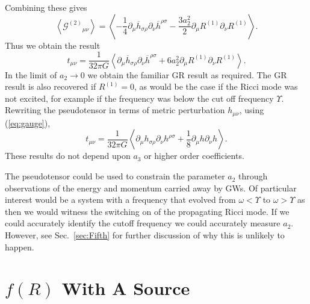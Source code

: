 \documentclass[aps,prd,amsfonts,amssymb,amsmath,nofootinbib,reprint,showpacs]{revtex4-1}
\newcommand{\eqnref}[1]{(\ref{eq:#1})}
\newcommand{\secref}[1]{Sec.\ \ref{sec:#1}}
\newcommand{\recip}[1]{\ensuremath{\frac{1}{#1}}}
\begin{document}
Combining these gives
\begin{equation}
\left\langle {\mathcal{G}^{(2)}}_{\mu\nu}\right\rangle = \left\langle -\recip{4} \partial_\mu\overline{h}_{\sigma\rho}\partial_\nu\overline{h}^{\rho\sigma} - \frac{3a_2^2}{2}\partial_\mu R^{(1)}\partial_\nu R^{(1)} \right\rangle.
\end{equation}
Thus we obtain the result
\begin{equation}
t_{\mu\nu} = \recip{32\pi G}\left\langle \partial_\mu\overline{h}_{\sigma\rho}\partial_\nu\overline{h}^{\rho\sigma} + 6a_2^2\partial_\mu R^{(1)}\partial_\nu R^{(1)} \right\rangle.
\label{eq:Pseudotensor}
\end{equation}
In the limit of $a_2 \rightarrow 0$ we obtain the familiar GR result as required. The GR result is also recovered if $R^{(1)} = 0$, as would be the case if the Ricci mode was not excited, for example if the frequency was below the cut off frequency $\Upsilon$. Rewriting the pseudotensor in terms of metric perturbation $h_{\mu\nu}$, using \eqnref{gauge},
\begin{equation}
t_{\mu\nu} = \recip{32\pi G}\left\langle \partial_\mu h_{\sigma\rho}\partial_\nu h^{\rho\sigma} + \recip{8}\partial_\mu h \partial_\nu h \right\rangle.
\end{equation}
These results do not depend upon $a_3$ or higher order coefficients.

The pseudotensor could be used to constrain the parameter $a_2$ through observations of the energy and momentum carried away by GWs. Of particular interest would be a system with a frequency that evolved from $\omega < \Upsilon$ to $\omega > \Upsilon$ as then we would witness the switching on of the propagating Ricci mode. If we could accurately identify the cutoff frequency we could accurately measure $a_2$. However, see \secref{Fifth} for further discussion of why this is unlikely to happen.

\section{$f(R)$ With A Source\label{sec:Source}}
\end{document}
